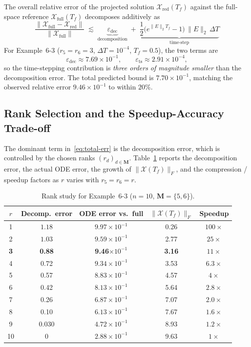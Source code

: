 \documentclass[11pt, oneside]{article}  %
\newcommand{\norm}[1]{\parallel\! #1\! \parallel}
\newcommand{\varp}{\varepsilon}
\newcommand{\caM}{\mathbf{M}}
\newcommand{\X}{\mathcal{X}}
\newcommand{\beq}{\begin{equation}}
\newcommand{\eeq}{\end{equation}}
\begin{document}
The overall relative error of the projected solution $\X_{\text{red}}(T_f)$ against the full-space reference $\X_{\text{full}}(T_f)$ decomposes additively as
\beq\label{eq:total-err}
\frac{\norm{\X_{\text{full}}-\X_{\text{red}}}}{\norm{\X_{\text{full}}}}\;\lesssim\;
\underbrace{\varp_{\text{dec}}}_{\text{decomposition}}\;+\; \underbrace{\frac{1}{2}\bigl(e^{\norm{E}_2T_f}-1\bigr)\,\norm{E}_2\,\Delta T}_{\text{time-step}}
\eeq
For Example~6-3 ($r_5=r_6=3$, $\Delta T=10^{-4}$, $T_f=0.5$), the two terms are
\[
\varp_{\text{dec}} \approx 7.69\times 10^{-1}, 
\qquad
\varp_{\text{ts}}  \approx 2.91\times 10^{-4},
\]
so the time-stepping contribution is \emph{three orders of magnitude smaller} than the decomposition error.  The total predicted bound is
 $7.70\times 10^{-1}$, matching the observed relative error $9.46\times 10^{-1}$ to within $20\%$.

\subsection{Rank Selection and the Speedup-Accuracy Trade-off}
\label{sec7-4:rank}

The dominant term in~\eqref{eq:total-err} is the decomposition error, which is controlled by the chosen ranks $(r_d)_{d\in\caM}$. 
Table~\ref{tab:rank-sweep} reports the decomposition error, the actual ODE error, the growth of $\norm{\X(T_f)}_F$, and the compression / speedup factors as $r$ varies with $r_5=r_6=r$.

\begin{table}[h]
\centering
\caption{Rank study for Example~6-3 ($n=10$, $\caM=\{5,6\}$).}
\label{tab:rank-sweep}
\begin{tabular}{c|cc|cc}
\hline
$r$ & Decomp.\ error & ODE error vs.\ full & $\norm{\X(T_f)}_F$ & Speedup \\
\hline
1 & $1.18$   & $9.97\times 10^{-1}$ & 0.26  & $100\times$ \\
2 & $1.03$   & $9.59\times 10^{-1}$ & 2.77  & $25\times$  \\
\textbf{3} & \textbf{0.88} & \textbf{9.46$\times 10^{-1}$} & \textbf{3.16} & \textbf{$11\times$} \\
4 & 0.72   & $9.34\times 10^{-1}$ & 3.53  & $6.3\times$ \\
5 & 0.57   & $8.83\times 10^{-1}$ & 4.57  & $4\times$   \\
6 & 0.42   & $8.13\times 10^{-1}$ & 5.64  & $2.8\times$ \\
7 & 0.26   & $6.87\times 10^{-1}$ & 7.07  & $2.0\times$ \\
8 & 0.10   & $6.13\times 10^{-1}$ & 7.67  & $1.6\times$ \\
9 & 0.030  & $4.72\times 10^{-1}$ & 8.93  & $1.2\times$ \\
10& 0       & $2.88\times 10^{-1}$ & 9.63  & $1\times$   \\
\hline
\end{tabular}
\end{table}
\end{document}
